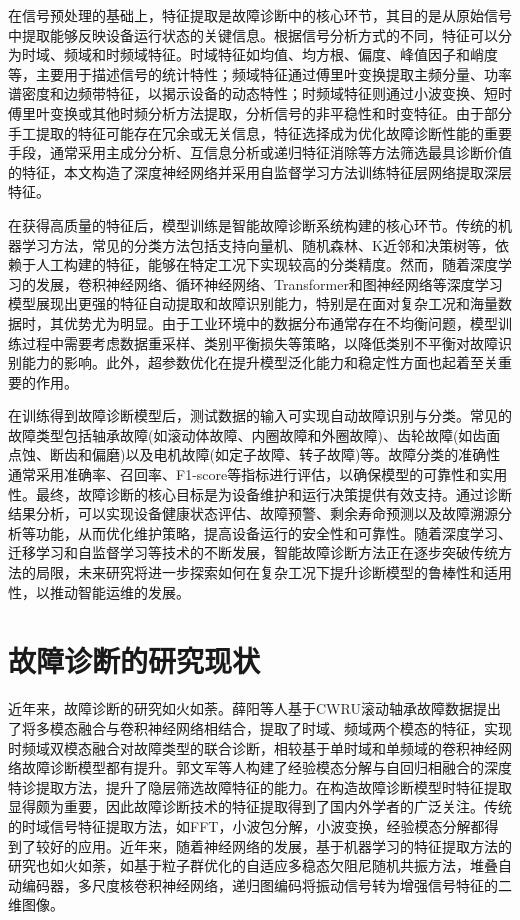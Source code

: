 \documentclass[master]{thesis-uestc}
\begin{document}
在信号预处理的基础上，特征提取是故障诊断中的核心环节，其目的是从原始信号中提取能够反映设备运行状态的关键信息。根据信号分析方式的不同，特征可以分为时域、频域和时频域特征。时域特征如均值、均方根、偏度、峰值因子和峭度等，主要用于描述信号的统计特性；频域特征通过傅里叶变换提取主频分量、功率谱密度和边频带特征，以揭示设备的动态特性；时频域特征则通过小波变换、短时傅里叶变换或其他时频分析方法提取，分析信号的非平稳性和时变特征。由于部分手工提取的特征可能存在冗余或无关信息，特征选择成为优化故障诊断性能的重要手段，通常采用主成分分析、互信息分析或递归特征消除等方法筛选最具诊断价值的特征，本文构造了深度神经网络并采用自监督学习方法训练特征层网络提取深层特征。

在获得高质量的特征后，模型训练是智能故障诊断系统构建的核心环节。传统的机器学习方法，常见的分类方法包括支持向量机、随机森林、K近邻和决策树等，依赖于人工构建的特征，能够在特定工况下实现较高的分类精度。然而，随着深度学习的发展，卷积神经网络、循环神经网络、Transformer和图神经网络等深度学习模型展现出更强的特征自动提取和故障识别能力，特别是在面对复杂工况和海量数据时，其优势尤为明显。由于工业环境中的数据分布通常存在不均衡问题，模型训练过程中需要考虑数据重采样、类别平衡损失等策略，以降低类别不平衡对故障识别能力的影响。此外，超参数优化在提升模型泛化能力和稳定性方面也起着至关重要的作用。

在训练得到故障诊断模型后，测试数据的输入可实现自动故障识别与分类。常见的故障类型包括轴承故障(如滚动体故障、内圈故障和外圈故障)、齿轮故障(如齿面点蚀、断齿和偏磨)以及电机故障(如定子故障、转子故障)等。故障分类的准确性通常采用准确率、召回率、F1-score等指标进行评估，以确保模型的可靠性和实用性。最终，故障诊断的核心目标是为设备维护和运行决策提供有效支持。通过诊断结果分析，可以实现设备健康状态评估、故障预警、剩余寿命预测以及故障溯源分析等功能，从而优化维护策略，提高设备运行的安全性和可靠性。随着深度学习、迁移学习和自监督学习等技术的不断发展，智能故障诊断方法正在逐步突破传统方法的局限，未来研究将进一步探索如何在复杂工况下提升诊断模型的鲁棒性和适用性，以推动智能运维的发展。
\FloatBarrier  %
\section{故障诊断的研究现状}
近年来，故障诊断的研究如火如荼。薛阳等人基于CWRU滚动轴承故障数据提出了将多模态融合与卷积神经网络相结合，提取了时域、频域两个模态的特征，实现时频域双模态融合对故障类型的联合诊断，相较基于单时域和单频域的卷积神经网络故障诊断模型都有提升。郭文军等人构建了经验模态分解与自回归相融合的深度特诊提取方法，提升了隐层筛选故障特征的能力。在构造故障诊断模型时特征提取显得颇为重要，因此故障诊断技术的特征提取得到了国内外学者的广泛关注。传统的时域信号特征提取方法，如FFT，小波包分解，小波变换，经验模态分解都得到了较好的应用。近年来，随着神经网络的发展，基于机器学习的特征提取方法的研究也如火如荼，如基于粒子群优化的自适应多稳态欠阻尼随机共振方法，堆叠自动编码器，多尺度核卷积神经网络，递归图编码将振动信号转为增强信号特征的二维图像。
\end{document}
